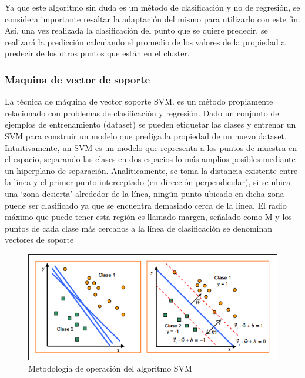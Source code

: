Ya que este algoritmo sin duda es un método de clasificación y no
de regresión, se considera importante resaltar la adaptación del mismo
para utilizarlo con este fin. Así, una vez realizada la clasificación
del punto que se quiere predecir, se realizará la predicción calculando
el promedio de los valores de la propiedad a predecir de los otros
puntos que están en el cluster. 


\subsubsection{Maquina de vector de soporte}

La técnica de máquina de vector soporte \ac{SVM}. es un método propiamente
relacionado con problemas de clasificación y regresión. Dado un conjunto
de ejemplos de entrenamiento (dataset) se pueden etiquetar las clases
y entrenar un SVM para construir un modelo que prediga la propiedad
de un nuevo dataset. Intuitivamente, un SVM es un modelo que representa
a los puntos de muestra en el espacio, separando las clases en dos
espacios lo más amplios posibles mediante un hiperplano de separación.
Analíticamente, se toma la distancia existente entre la línea y el
primer punto interceptado (en dirección perpendicular), si se ubica
una ‘zona desierta’ alrededor de la línea, ningún punto ubicado en
dicha zona puede ser clasificado ya que se encuentra demasiado cerca
de la línea. El radio máximo que puede tener esta región es llamado
margen, señalado como M y los puntos de cada clase más cercanos a
la línea de clasificación se denominan vectores de soporte

\begin{figure}
\begin{centering}
\includegraphics[scale=0.9]{images/SVM-metology}
\par\end{centering}

\caption{Metodología de operación del algoritmo SVM\label{fig:SVM-metology}}
\end{figure}




